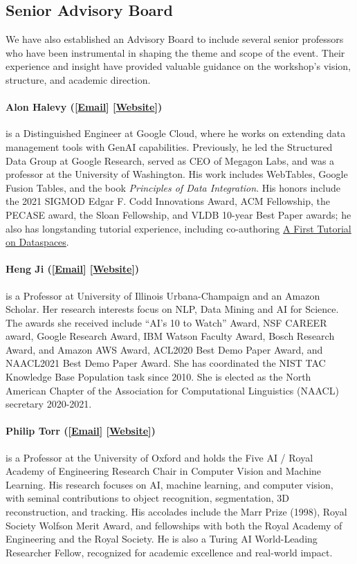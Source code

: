 \subsection{Senior Advisory Board}
We have also established an Advisory Board to include several senior professors who have been instrumental in shaping the theme and scope of the event. Their experience and insight have provided valuable guidance on the workshop’s vision, structure, and academic direction.

\paragraph{Alon Halevy ([\href{mailto:alonhalevy@gmail.com}{Email}] [\href{https://alonhalevy.blogspot.com/}{Website}])}
is a Distinguished Engineer at Google Cloud, where he works on extending data management tools with GenAI capabilities. Previously, he led the Structured Data Group at Google Research, served as CEO of Megagon Labs, and was a professor at the University of Washington. His work includes WebTables, Google Fusion Tables, and the book \emph{Principles of Data Integration}. His honors include the 2021 SIGMOD Edgar F. Codd Innovations Award, ACM Fellowship, the PECASE award, the Sloan Fellowship, and VLDB 10-year Best Paper awards; he also has longstanding tutorial experience, including co-authoring \href{https://www.vldb.org/pvldb/vol1/1454217.pdf}{A First Tutorial on Dataspaces}.

\paragraph{Heng Ji ([\href{mailto:hengji@illinois.edu}{Email}] [\href{https://blender.cs.illinois.edu/hengji.html}{Website}])}
is a Professor at University of Illinois Urbana-Champaign and an Amazon Scholar. Her research interests focus on NLP, Data Mining and AI for Science. The awards she received include “AI’s 10 to Watch” Award, NSF CAREER award, Google Research Award, IBM Watson Faculty Award, Bosch Research Award, and Amazon AWS Award, ACL2020 Best Demo Paper Award, and NAACL2021 Best Demo Paper Award. She has coordinated the NIST TAC Knowledge Base Population task since 2010. She is elected as the North American Chapter of the Association for Computational Linguistics (NAACL) secretary 2020-2021.

\paragraph{Philip Torr ([\href{mailto:philip.torr@eng.ox.ac.uk}{Email}] [\href{https://eng.ox.ac.uk/people/philip-torr/}{Website}])}
is a Professor at the University of Oxford and holds the Five AI / Royal Academy of Engineering Research Chair in Computer Vision and Machine Learning. His research focuses on AI, machine learning, and computer vision, with seminal contributions to object recognition, segmentation, 3D reconstruction, and tracking. His accolades include the Marr Prize (1998), Royal Society Wolfson Merit Award, and fellowships with both the Royal Academy of Engineering and the Royal Society. He is also a Turing AI World-Leading Researcher Fellow, recognized for academic excellence and real-world impact.


